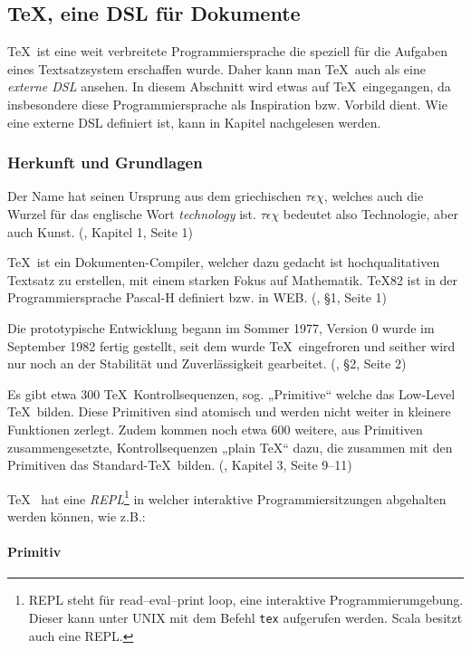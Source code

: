 \subsection{\TeX, eine DSL für Dokumente}

\TeX~ist eine weit verbreitete Programmiersprache die speziell für die
Aufgaben eines Textsatzsystem erschaffen wurde. Daher kann man
\TeX~auch als eine \emph{externe DSL} ansehen.
In diesem Abschnitt wird etwas auf
\TeX~eingegangen, da insbesondere diese Programmiersprache als Inspiration
bzw. Vorbild dient. Wie eine externe DSL definiert ist, kann in Kapitel
\label{sec-dsl} nachgelesen werden.


\subsubsection{Herkunft und Grundlagen}

Der Name hat seinen Ursprung aus dem griechischen $\tau\epsilon\chi$,
welches auch die Wurzel für das englische Wort \emph{technology} ist.
$\tau\epsilon\chi$ bedeutet also Technologie, aber auch Kunst.
(\cite{tex-a}, Kapitel 1, Seite 1)

\TeX~ist ein Dokumenten-Compiler, welcher dazu gedacht ist hochqualitativen
Textsatz zu erstellen, mit einem starken Fokus auf
Mathematik. \TeX82 ist in der Programmiersprache Pascal-H definiert
bzw. in WEB. (\cite{tex-b}, §1, Seite 1)

Die prototypische Entwicklung begann im Sommer 1977, Version 0 wurde
im September 1982 fertig gestellt, seit dem wurde \TeX~eingefroren
und seither wird nur noch an der Stabilität und Zuverlässigkeit
gearbeitet. (\cite{tex-b}, §2, Seite 2)

Es gibt etwa 300 \TeX~Kontrollsequenzen, sog. „Primitive“ welche das
Low-Level \TeX~bilden. Diese Primitiven sind atomisch und werden nicht weiter
in kleinere Funktionen zerlegt.
Zudem kommen noch etwa 600 weitere, aus Primitiven zusammengesetzte,
Kontrollsequenzen „plain \TeX“ dazu,
die zusammen mit den Primitiven das Standard-\TeX~bilden.
(\cite{tex-a}, Kapitel 3, Seite 9--11)

\TeX~ hat eine \emph{REPL}\footnote{REPL steht für read–eval–print loop,
eine interaktive Programmierumgebung. Dieser kann unter UNIX mit dem
Befehl \lstinline|tex| aufgerufen werden. Scala besitzt auch eine REPL.}
in welcher interaktive Programmiersitzungen abgehalten werden können,
wie z.B.:

\paragraph{Primitiv}

